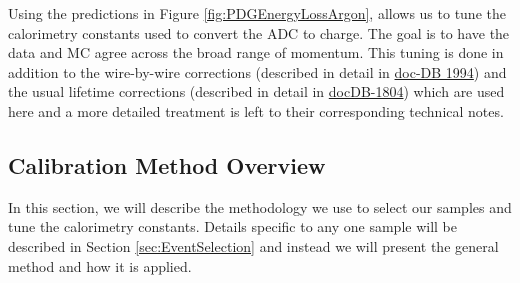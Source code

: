Using the predictions in Figure \ref{fig:PDGEnergyLossArgon}, allows us to tune the calorimetry constants used to convert the ADC to charge. The goal is to have the data and MC agree across the broad range of momentum. This tuning is done in addition to the wire-by-wire corrections (described in detail in \href{http://lartpc-docdb.fnal.gov:8080/cgi-bin/RetrieveFile?docid=1994&filename=investigation-uniformity-observed_v3.pdf&version=2}{doc-DB 1994}) and the usual lifetime corrections (described in detail in \href{http://lartpc-docdb.fnal.gov:8080/cgi-bin/ShowDocument?docid=1804}{docDB-1804}) which are used here and a more detailed treatment is left to their corresponding technical notes.

\subsection{Calibration Method Overview}\label{sec:MethodOverview}

In this section, we will describe the methodology we use to select our samples and tune the calorimetry constants. Details specific to any one sample will be described in Section  \ref{sec:EventSelection} and instead we will present the general method and how it is applied. 